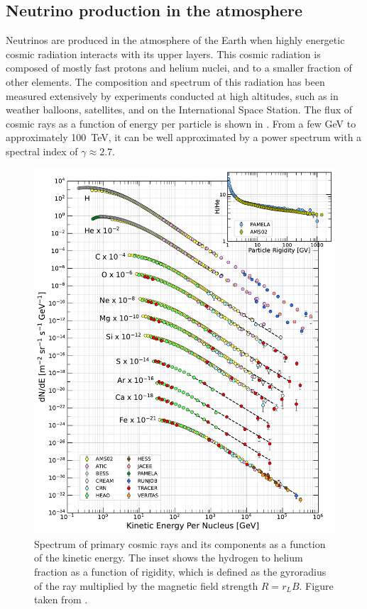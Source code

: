 \subsection{Neutrino production in the atmosphere}
Neutrinos are produced in the atmosphere of the Earth when highly energetic cosmic radiation interacts with its upper layers. This cosmic radiation is composed of mostly fast protons and helium nuclei, and to a smaller fraction of other elements. The composition and spectrum of this radiation has been measured extensively by experiments conducted at high altitudes, such as in weather balloons, satellites, and on the International Space Station. The flux of cosmic rays as a function of energy per particle is shown in . From a few GeV to approximately \SI{100}{TeV}, it can be well approximated by a power spectrum with a spectral index of $\gamma \approx 2.7$.
\begin{figure}
    \centering
    \includegraphics{figures/flux/2021_Figure_1_Inset_v1.pdf}
    \caption{Spectrum of primary cosmic rays and its components as a function of the kinetic energy. The inset shows the hydrogen to helium fraction as a function of rigidity, which is defined as the gyroradius of the ray multiplied by the magnetic field strength $R=r_L B$. Figure taken from \cite{pdg}.\label{fig:cr-primary-flux}}
\end{figure}
